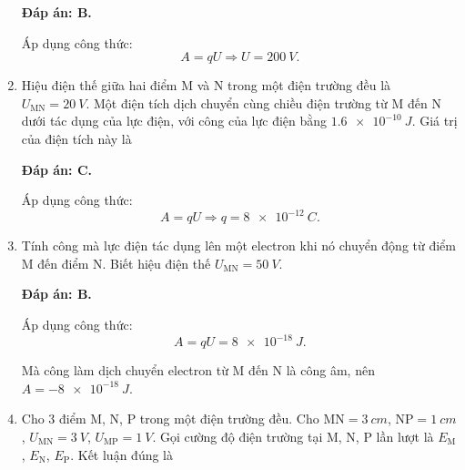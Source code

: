 \begin{enumerate}[label=\bfseries Câu \arabic*:]
{	}
	\loigiai
	{	\textbf{Đáp án: B.}
		
		Áp dụng công thức:
		$$A=qU \Rightarrow U = \SI{200}{V}.$$
	}
	\item {}
	
	\cauhoi
	{Hiệu điện thế giữa hai điểm M và N trong một điện trường đều là $U_\text{MN} = \SI{20}{V}$. Một điện tích dịch chuyển cùng chiều điện trường từ M đến N dưới tác dụng của lực điện, với công của lực điện bằng $\SI{1.6e-10}{J}$. Giá trị của điện tích này là
		
	}
	\loigiai
	{	\textbf{Đáp án: C.}
		
		Áp dụng công thức:
	$$A=qU \Rightarrow q = \SI{8e-12}{C}.$$
	}
	\item {}
	
	\cauhoi
	{Tính công mà lực điện tác dụng lên một electron khi nó chuyển động từ điểm M đến điểm N. Biết hiệu điện thế $U_\text{MN} = \SI{50}{V}$.
		
	}
	\loigiai
	{	\textbf{Đáp án: B.}
		
		Áp dụng công thức:
		$$A=qU=\SI{8e-18}{J}.$$
		
		Mà công làm dịch chuyển electron từ M đến N là công âm, nên $A=\SI{-8e-18}{J}$.
	}
	\item {}
	
	\cauhoi
	{Cho 3 điểm M, N, P trong một điện trường đều. Cho $\text{MN} = \SI{3}{cm}$, $\text{NP} = \SI{1}{cm}$, $U_\text{MN} = \SI{3}{V}$, $U_\text{MP} = \SI{1}{V}$. Gọi cường độ điện trường tại M, N, P lần lượt là $E_\text{M}$, $E_\text{N}$, $E_\text{P}$. Kết luận đúng là
		
}
\end{enumerate}
